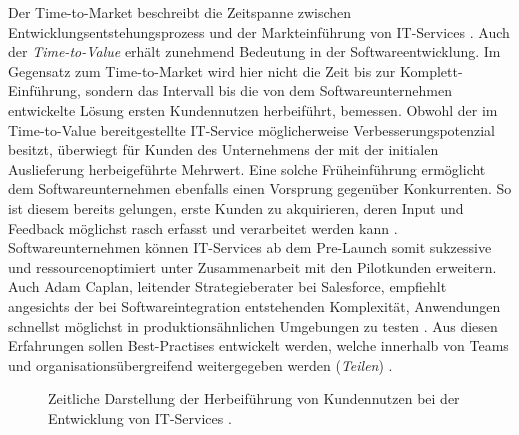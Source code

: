 Der Time-to-Market beschreibt die Zeitspanne zwischen Entwicklungsentstehungsprozess und der Markteinführung von IT-Services \cite[141]{Vesey.1992}. Auch der \textit{Time-to-Value} erhält zunehmend Bedeutung in der Softwareentwicklung. Im Gegensatz zum Time-to-Market wird hier nicht die Zeit bis zur Komplett-Einführung, sondern das Intervall bis die von dem Softwareunternehmen entwickelte Lösung ersten Kundennutzen herbeiführt, bemessen. Obwohl der im Time-to-Value bereitgestellte IT-Service möglicherweise Verbesserungspotenzial besitzt, überwiegt für Kunden des Unternehmens der mit der initialen Auslieferung herbeigeführte Mehrwert. Eine solche Früheinführung ermöglicht dem Softwareunternehmen ebenfalls einen Vorsprung gegenüber Konkurrenten. So ist diesem bereits gelungen, erste Kunden zu akquirieren, deren Input und Feedback möglichst rasch erfasst und verarbeitet werden kann \cite[9]{Halstenberg.2020}. Softwareunternehmen können IT-Services ab dem Pre-Launch somit sukzessive und ressourcenoptimiert unter Zusammenarbeit mit den Pilotkunden erweitern. Auch Adam Caplan, leitender Strategieberater bei Salesforce, empfiehlt angesichts der bei Softwareintegration entstehenden Komplexität, Anwendungen schnellst möglichst in produktionsähnlichen Umgebungen zu testen \cite{Vesey.1992}. Aus diesen Erfahrungen sollen Best-Practises entwickelt werden, welche innerhalb von Teams und organisationsübergreifend weitergegeben werden (\textit{Teilen}) \cite[7]{Halstenberg.2020}. 
\begin{center}
	\begin{figure}[H]
		\centering
		\caption[Zeitliche Darstellung der Herbeiführung von Kundennutzen bei der Entwicklung von IT-Services]{Zeitliche Darstellung der Herbeiführung von Kundennutzen bei der Entwicklung von IT-Services \cite[9]{Halstenberg.2020}.}
		\label{fig:TTM}
	\end{figure}
\end{center}
\vspace*{-15mm}

